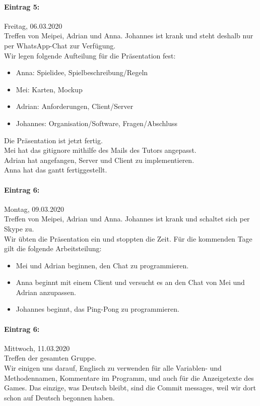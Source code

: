 \documentclass[12pt]{article}
\begin{document}
\paragraph{Eintrag 5:}
Freitag, 06.03.2020\\
Treffen von Meipei, Adrian und Anna. Johannes ist krank und steht deshalb nur per WhatsApp-Chat zur Verf\"ugung.\\
Wir legen folgende Aufteilung für die Pr\"asentation fest:
\begin{itemize}
\item Anna: Spielidee, Spielbeschreibung/Regeln
\item Mei: Karten, Mockup
\item Adrian: Anforderungen, Client/Server
\item Johannes: Organisation/Software, Fragen/Abschluss
\end{itemize}

\noindent Die Pr\"asentation  ist jetzt fertig.\\
Mei hat das gitignore mithilfe des Mails des Tutors angepasst.\\
Adrian hat angefangen, Server und Client zu implementieren.\\ 
Anna hat das gantt fertiggestellt.

\paragraph{Eintrag 6:}
Montag, 09.03.2020\\
Treffen von Meipei, Adrian und Anna. Johannes ist krank und schaltet sich per Skype zu.\\
Wir übten die Pr\"asentation ein und stoppten die Zeit. Für die kommenden Tage gilt die folgende Arbeitsteilung:
\begin{itemize} 
\item Mei und Adrian beginnen, den Chat zu programmieren.
\item Anna beginnt mit einem Client und versucht es an den Chat von Mei und Adrian anzupassen.
\item Johannes beginnt, das Ping-Pong zu programmieren.
\end{itemize}

\paragraph{Eintrag 6:}
Mittwoch, 11.03.2020\\
Treffen der gesamten Gruppe.\\
Wir einigen uns darauf, Englisch zu verwenden f\"ur alle Variablen- und Methodennamen, Kommentare im Programm, und auch f\"ur die Anzeigetexte des Games. Das einzige, was Deutsch bleibt, sind die Commit messages, weil wir dort schon auf Deutsch begonnen haben.\\
\end{document}
